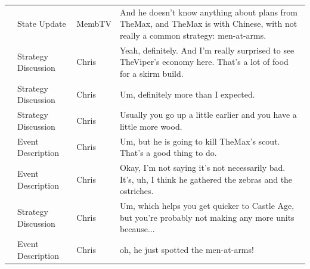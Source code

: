 {\begin{longtable}{@{}>{\theAppRow}r|L{2.3cm}L{1.0cm}U{11.55cm}@{}}
    & State Update          & MembTV       & And he doesn't know anything about plans from TheMax, and TheMax is with Chinese, with not really a common strategy: men-at-arms.                                                                                                                                \\
    & Strategy Discussion   & Chris        & Yeah, definitely. And I'm really surprised to see TheViper's economy here. That's a lot of food for a skirm build.                                                                                                                                               \\
    & Strategy Discussion   & Chris        & Um, definitely more than I expected.                                                                                                                                                                                                                             \\
    & Strategy Discussion   & Chris        & Usually you go up a little earlier and you have a little more wood.                                                                                                                                                                                              \\
    & Event Description     & Chris        & Um, but he is going to kill TheMax's scout. That's a good thing to do.                                                                                                                                                                                           \\
    & Event Description     & Chris        & Okay, I'm not saying it's not necessarily bad. It's, uh, I think he gathered the zebras and the ostriches.                                                                                                                                                       \\
    & Strategy Discussion   & Chris        & Um, which helps you get quicker to Castle Age, but you're probably not making any more units because...                                                                                                                                                          \\
    & Event Description     & Chris        & oh, he just spotted the men-at-arms!                                                                                                                                                                                                                             \\

\end{longtable}}
